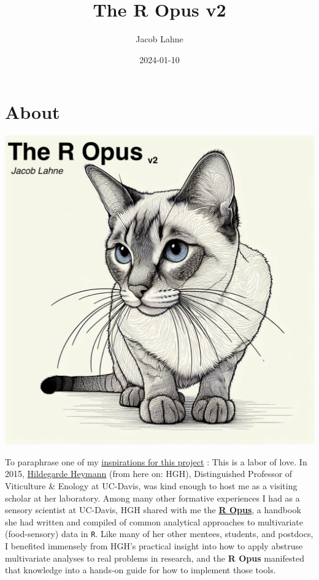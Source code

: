 \documentclass[
]{book}
\title{The R Opus v2}
\author{Jacob Lahne}
\date{2024-01-10}
\begin{document}
\maketitle

{
\setcounter{tocdepth}{1}
\tableofcontents
}
\chapter*{About}\label{about}

\begin{center}\includegraphics{img/r-opus-cover} \end{center}

To paraphrase one of my \href{https://bookdown.org/content/3890/}{inspirations for this project} \citep{kurzDoingBayesianDataAnalysis2023}: This is a labor of love. In 2015, \href{https://wineserver.ucdavis.edu/people/hildegarde-heymann\#/}{Hildegarde Heymann} (from here on: HGH), Distinguished Professor of Viticulture \& Enology at UC-Davis, was kind enough to host me as a visiting scholar at her laboratory. Among many other formative experiences I had as a sensory scientist at UC-Davis, HGH shared with me the \href{files/The\%20R\%20Opus\%20-\%20May\%202015.pdf}{\textbf{R Opus}}, a handbook she had written and compiled of common analytical approaches to multivariate (food-sensory) data in \texttt{R}. Like many of her other mentees, students, and postdocs, I benefited immensely from HGH's practical insight into how to apply abstruse multivariate analyses to real problems in research, and the \textbf{R Opus} manifested that knowledge into a hands-on guide for how to implement those tools.
\end{document}

